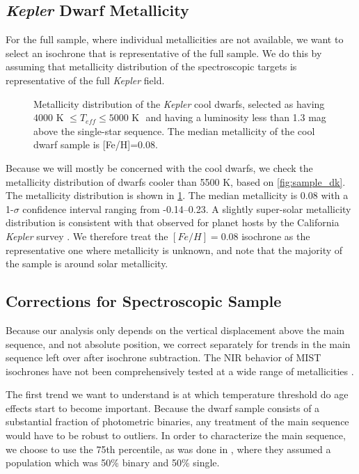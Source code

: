 \documentclass[manuscript]{aastex6}
\newcommand{\Kepler}{\mbox{\textit{Kepler}}}
\newcommand{\Teff}{\ensuremath{T_{eff}}}
\begin{document}
\subsection{\Kepler{} Dwarf Metallicity}

For the full \citet{McQuillan14} sample, where individual metallicities are not
available, we want to select an isochrone that is representative of the full 
sample. We do this by assuming that metallicity distribution of the 
spectroscopic targets is representative of the full \Kepler{} field. 

\begin{figure}[htb]
    \centering
    \caption{Metallicity distribution of the \Kepler{} cool dwarfs, selected as
        having \(4000 \textrm{ K } \le \Teff \le 5000 \textrm{ K }\) and having
        a luminosity less than 1.3 mag above the single-star sequence. The 
        median metallicity of the cool dwarf sample is [Fe/H]=0.08.}
    \label{fig:metallicity}
\end{figure}

Because we will mostly be concerned with the cool dwarfs, we check the
metallicity distribution of dwarfs cooler than 5500 K, based on 
\cref{fig:sample_dk}. The metallicity distribution is shown in
\cref{fig:metallicity}. The median metallicity is 0.08 with a 1-\(\sigma\)
confidence interval ranging from -0.14--0.23. A slightly super-solar
metallicity distribution is consistent with that observed for planet hosts by 
the California \Kepler{} survey \citep{Petigura17}.  We therefore treat the \([Fe/H] =
0.08\) isochrone as the representative one where metallicity is unknown, and
note that the majority of the sample is around solar metallicity.

\subsection{Corrections for Spectroscopic Sample}

Because our analysis only depends on the vertical displacement above the main
sequence, and not absolute position, we correct separately for trends in the
main sequence left over after isochrone subtraction. The NIR behavior of MIST 
isochrones have not been comprehensively tested at a wide range of 
metallicities \citep{Choi16}.

The first trend we want to understand is at which temperature threshold do age
effects start to become important. Because the dwarf sample consists of a
substantial fraction of photometric binaries, any treatment of the main
sequence would have to be robust to outliers. In order to characterize the main
sequence, we choose to use the 75th percentile, as was done in
\citep{Mermilliod92}, where they assumed a population which was 50\% binary and
50\% single. 
\end{document}
